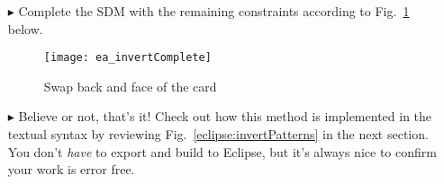 \begin{itemize}
\vspace*{0.5cm}

\item[$\blacktriangleright$] Complete the SDM with the remaining constraints according to Fig.~\ref{ea:sdm_invertComplete} below.

\vspace{0.5cm}

\begin{figure}[htbp]
\begin{center}
  \texttt{[image: ea\_invertComplete]}
  \caption{Swap back and face of the card}  
  \label{ea:sdm_invertComplete}
\end{center}
\end{figure}

\vspace{0.5cm}

\item[$\blacktriangleright$] Believe or not, that's it! Check out how this method is implemented in the textual syntax by reviewing
Fig.~\ref{eclipse:invertPatterns} in the next section. You don't \emph{have} to export and build to Eclipse, but it's always nice to confirm your work is error
free.


\end{itemize}
